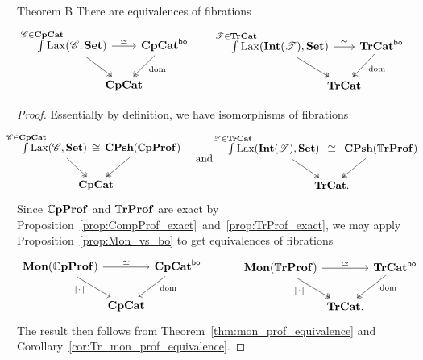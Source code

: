\documentclass[11pt,oneside,article]{memoir}
\begin{document}
\begin{named}{Theorem B}
    \label{thm:TheoremB}
  There are equivalences of fibrations
  \begin{equation*}
    \begin{tikzcd}[column sep=-1em]
      \int\limits^{\mathclap{\cat{C}\in\CompCat}} \Lax(\cat{C},\Set)
          \ar[rr,"\equiv"] \ar[dr,two heads]
        && \CompCat^{\bo} \ar[dl,two heads,"\dom" pos=.4] \\
      & \CompCat &
    \end{tikzcd}
    \qquad\quad
    \begin{tikzcd}[column sep=-1em]
      \int\limits^{\mathclap{\cat{T}\in\TrCat}} \Lax(\Int(\cat{T}),\Set)
          \ar[rr,"\equiv"] \ar[dr,two heads]
        && \TrCat^{\bo} \ar[dl,two heads,"\dom" pos=.4] \\
      & \TrCat &
    \end{tikzcd}
  \end{equation*}
\end{named}
\begin{proof}
  Essentially by definition, we have isomorphisms of fibrations
  \begin{equation*}
    \begin{tikzcd}[column sep=-2em]
      \int\limits^{\mathclap{\cat{C}\in\CompCat}}\Lax(\cat{C},\Set)~
          \ar[rr,phantom,"\iso"] \ar[dr,two heads]
        && ~\CPsh(\dCompProf) \ar[dl,two heads] \\
      & \CompCat &
    \end{tikzcd}
    \quad\text{and}\quad
    \begin{tikzcd}[column sep=-2em]
      \int\limits^{\mathclap{\cat{T}\in\TrCat}}\Lax(\Int(\cat{T}),\Set)~~
          \ar[rr,phantom,"\iso"] \ar[dr,two heads]
        && ~~\CPsh(\dTrProf) \ar[dl,two heads] \\
      & \TrCat. &
    \end{tikzcd}
  \end{equation*}
  Since $\mathbb{C}\mathbf{pProf}$ and $\mathbb{T}\mathbf{rProf}$ are exact by
  Proposition~\ref{prop:CompProf_exact}~and~\ref{prop:TrProf_exact}, we may apply
  Proposition~\ref{prop:Mon_vs_bo} to get equivalences of fibrations
  \begin{equation*}
    \begin{tikzcd}[column sep=0em]
      \Mon(\dCompProf) \ar[rr,"\equiv"] \ar[dr,"\MOb"' pos=.3]
        && \CompCat^{\bo} \ar[dl,"\dom" pos=.3] \\
      & \CompCat &
    \end{tikzcd}
    \qquad\quad
    \begin{tikzcd}[column sep=0em]
      \Mon(\dTrProf) \ar[rr,"\equiv"] \ar[dr,two heads,"\MOb"' pos=.3]
        && \TrCat^{\bo} \ar[dl,two heads,"\dom" pos=.3] \\
      & \TrCat. &
    \end{tikzcd}
  \end{equation*}
  The result then follows from Theorem~\ref{thm:mon_prof_equivalence} and
  Corollary~\ref{cor:Tr_mon_prof_equivalence}.
\end{proof}
\end{document}
